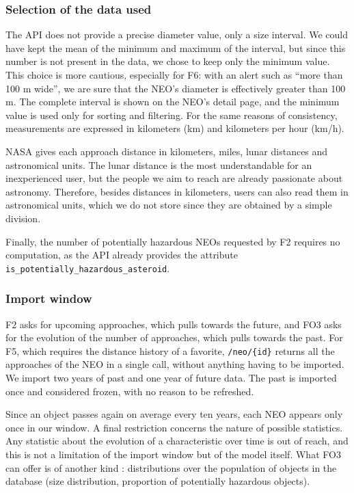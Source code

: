 \subsubsection{Selection of the data used}

The API does not provide a precise diameter value, only a size interval. We
could have kept the mean of the minimum and maximum of the interval, but
since this number is not present in the data, we chose to keep only the
minimum value. This choice is more cautious, especially for F6: with an
alert such as ``more than 100 m wide'', we are sure that the NEO's diameter
is effectively greater than 100 m. The complete interval is shown on the
NEO's detail page, and the minimum value is used only for sorting and
filtering. For the same reasons of consistency, measurements are expressed
in kilometers (km) and kilometers per hour (km/h).

NASA gives each approach distance in kilometers, miles, lunar distances and
astronomical units. The lunar distance is the most understandable for an
inexperienced user, but the people we aim to reach are already passionate
about astronomy. Therefore, besides distances in kilometers, users can also
read them in astronomical units, which we do not store since they are
obtained by a simple division.

Finally, the number of potentially hazardous NEOs requested by F2 requires
no computation, as the API already provides the attribute
\texttt{is\_potentially\_hazardous\_asteroid}.

\subsubsection{Import window}

F2 asks for upcoming approaches, which pulls towards the future, and FO3
asks for the evolution of the number of approaches, which pulls towards the
past. For F5, which requires the distance history of a favorite,
\texttt{/neo/\{id\}} returns all the approaches of the NEO in a single call,
without anything having to be imported. We import two years of past and one
year of future data. The past is imported once and considered frozen, with
no reason to be refreshed.

Since an object passes again on average every ten years, each NEO appears
only once in our window. A final restriction concerns the
nature of possible statistics. Any statistic about the evolution of a
characteristic over time is out of reach, and this is not a limitation of
the import window but of the model itself. What FO3 can offer is of another
kind : distributions over the population of objects in the database (size
distribution, proportion of potentially hazardous objects).


